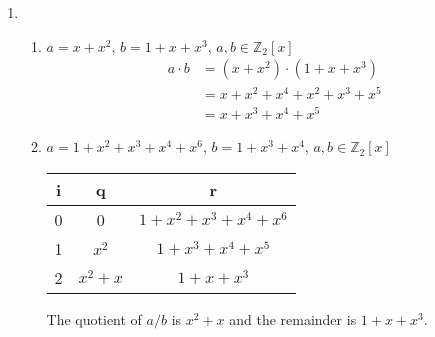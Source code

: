\documentclass[11pt,a4paper]{article}
\begin{document}
\begin{enumerate}
	\item
	      \begin{enumerate}
		      \item $a = x + x^2$, \hspace{1cm} $b = 1 + x + x^3$, \hspace{1cm} $a, b \in \mathbb{Z}_2[x]$
		            \begin{align*}
			            a \cdot b & = (x + x^2) \cdot (1 + x + x^3)   \\
			                      & = x + x^2 + x^4 + x^2 + x^3 + x^5 \\
			                      & =x + x^3 + x^4 + x^5
		            \end{align*}
		      \item $a = 1 + x^2 + x^3 + x^4 + x^6$, \hspace{1cm} $b = 1 + x^3 + x^4$, \hspace{1cm} $a, b \in \mathbb{Z}_2[x]$
		            \begin{center}
			            \begin{tabular}{ c|c|c }

				            i & q         & r                           \\
				            \hline
				            0 & 0         & $1 + x^2 + x^3 + x^4 + x^6$ \\
				            1 & $x^2$     & $1 + x^3 + x^4 + x^5$       \\
				            2 & $x^2 + x$ & $1 + x + x^3$               \\
			            \end{tabular}
		            \end{center}
		            The quotient of $a / b$ is $x^2 + x$ and the remainder is $1 + x + x^3$.
	      \end{enumerate}

	      \newpage


\end{enumerate}
\end{document}
